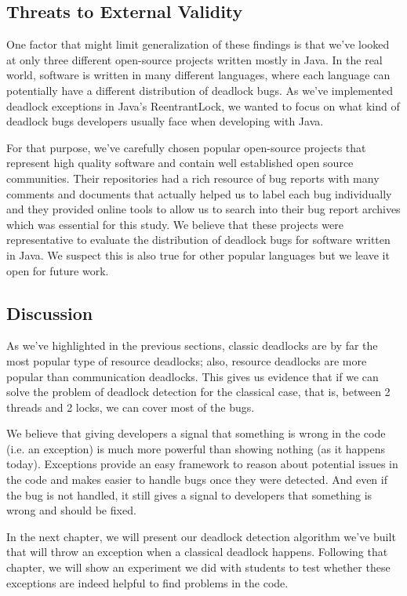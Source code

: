 \subsection{Threats to External Validity}

One factor that might limit generalization of these findings is that we've looked at only three different open-source projects written mostly in Java.
In the real world, software is written in many different languages, where each language can potentially have a different distribution of deadlock bugs.
As we've implemented deadlock exceptions in Java's ReentrantLock, we wanted to focus on what kind of deadlock bugs developers usually face when developing with Java.

For that purpose, we've carefully chosen popular open-source projects that represent high quality software and contain well established open source communities.
Their repositories had a rich resource of bug reports with many comments and documents that actually helped us to label each bug individually and they provided
online tools to allow us to search into their bug report archives which was essential for this study.
We believe that these projects were representative to evaluate the distribution of deadlock bugs for software written in Java.
We suspect this is also true for other popular languages but we leave it open for future work.

\subsection{Discussion}

As we've highlighted in the previous sections, classic deadlocks are by far the most popular type of resource deadlocks; also, resource deadlocks are more popular than communication deadlocks. This gives us evidence that if we can solve the problem of deadlock detection for the classical case, that is, between 2 threads and 2 locks, we can cover most of the bugs.

We believe that giving developers a signal that something is wrong in the code (i.e. an exception) is much more powerful than showing nothing (as it happens today). Exceptions provide an easy framework to reason about potential issues in the code and makes easier to handle bugs once they were detected. And even if the bug is not handled, it still gives a signal to developers that something is wrong and should be fixed.

In the next chapter, we will present our deadlock detection algorithm we've built that will throw an exception when a classical deadlock happens. Following that chapter, we will show an experiment we did with students to test whether these exceptions are indeed helpful to find problems in the code.

